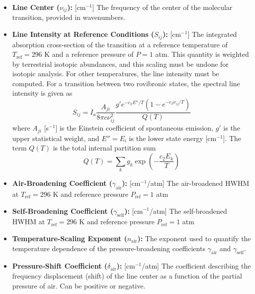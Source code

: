 \documentclass[8pt,a4paper]{report}
\begin{document}
	\begin{itemize}
		\item \textbf{Line Center ($\nu_{ij}$):} [$\text{cm}^{-1}$] The frequency of the center of the molecular transition, provided in wavenumbers.
		\item \textbf{Line Intensity at Reference Conditions ($S_{ij}$):} [$\text{cm}^{-1}$] The integrated absorption cross-section of the transition at a reference temperature of $T_\mathrm{ref} = 296$ K and a reference pressure of $P=1$ atm. This quantity is weighted by terrestrial isotopic abundances, and this scaling must be undone for isotopic analysis. For other temperatures, the line intensity must be computed. For a transition between two rovibronic states, the spectral line intensity is given as
		\begin{equation}\label{hitran_S}
			S_{ij} = I_a \frac{A_{ji}}{8\pi c \nu_{ij}^2}\frac{g' e^{-c_2E''/T} \left(1-e^{-c_2\nu_{ij} /T}\right)}{Q(T)}
		\end{equation}
		where $A_{ji}$ [s$^{-1}$] is the Einstein coefficient of spontaneous emission, $g'$ is the upper statistical weight, and $E'' = E_i$ is the lower state energy [cm$^{-1}$]. The term $Q(T)$ is the total internal partition sum
		\begin{equation}
			Q(T) = \sum_k g_k \exp\left(-\frac{c_2 E_k}{T}\right)
		\end{equation}
		\item \textbf{Air-Broadening Coefficient ($\gamma_{\mathrm{air}}$):} [cm$^{-1}$/atm] The air-broadened HWHM at $T_\mathrm{ref} = 296$ K and reference pressure $P_\mathrm{ref} = 1$ atm
		\item \textbf{Self-Broadening Coefficient ($\gamma_\mathrm{self}$):} [cm$^{-1}$/atm] The self-broadened HWHM at $T_\mathrm{ref} = 296$ K and reference pressure $P_\mathrm{ref} = 1$ atm
		\item \textbf{Temperature-Scaling Exponent ($n_\mathrm{air}$):} The exponent used to quantify the temperature dependence of the pressure-broadening coefficients $\gamma_\mathrm{air}$ and $\gamma_\mathrm{self}$.
		\item \textbf{Pressure-Shift Coefficient ($\delta_{\text{air}}$):} [cm$^{-1}$/atm] The coefficient describing the frequency displacement (shift) of the line center as a function of the partial pressure of air. Can be positive or negative.

\end{itemize}
\end{document}
